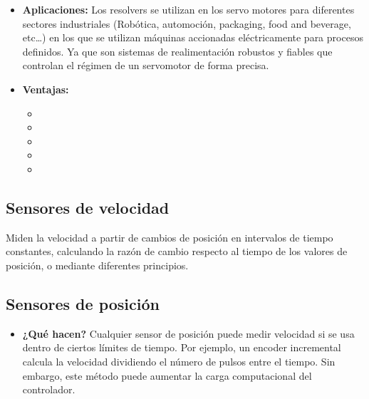 \begin{itemize}
	\item \textbf{Aplicaciones:} Los resolvers se utilizan en los servo motores para diferentes sectores industriales (Robótica, automoción, packaging, food and beverage, etc…) en los que se utilizan máquinas accionadas eléctricamente para procesos definidos. Ya que son sistemas de realimentación robustos y fiables que controlan el régimen de un servomotor de forma precisa.
	\item \textbf{Ventajas:}
	\begin{itemize}
		\item {} 
		\item {} 
		\item {} 
		\item {}
		\item {}
	\end{itemize}
\end{itemize}




\subsection{Sensores de velocidad} Miden la velocidad a partir de cambios de posición en intervalos de tiempo constantes, calculando la razón de cambio respecto al tiempo de los valores de posición, o mediante diferentes principios.
\subsection*{Sensores de posición}
\begin{itemize}
	\item \textbf{¿Qué hacen?} Cualquier sensor de posición puede medir velocidad si se usa dentro de ciertos límites de tiempo. Por ejemplo, un encoder incremental calcula la velocidad dividiendo el número de pulsos entre el tiempo. Sin embargo, este método puede aumentar la carga computacional del controlador.
	
\end{itemize}
